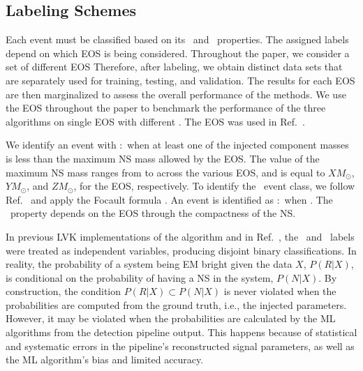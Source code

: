 \subsection*{Labeling Schemes}


Each event must be classified based on its \hasns\ and \hasrem\ properties. The assigned labels depend on which \ac{EOS} is being considered. Throughout the paper, we consider a set of
 different EOS   Therefore, after labeling, we obtain  distinct data sets that are separately used
for training, testing, and validation. The results for each \ac{EOS} are then marginalized to assess the overall performance of the methods. We use the  \ac{EOS}
throughout the paper to benchmark the performance of the three algorithms on single \ac{EOS} with different . The  \ac{EOS} was used in
Ref.\ .


We identify an event with \hasns:\true\ when at least one of the injected component masses is less than the maximum \ac{NS} mass allowed by the \ac{EOS}. The value of the maximum
\ac{NS} mass ranges from  to  across the various \ac{EOS}, and is equal to $XM_\odot$, $YM_\odot$, and $ZM_\odot$, for the  \ac{EOS}, respectively. To
identify the \hasrem\ event class, we follow Ref.\  and apply the Focault formula . An event is identified as \hasrem:\true\ when .
The \hasrem\ property depends on the \ac{EOS} through the compactness of the \ac{NS}.

In previous \ac{LVK} implementations of the algorithm and in Ref.\ , the \hasns\ and \hasrem\ labels were treated as independent variables, producing disjoint
binary classifications. In reality, the probability of a system being \ac{EM} bright given the data $X$, $P(R|X)$, is conditional on the probability of having a \ac{NS} in the system,
$P(N|X)$. By construction, the condition $P(R|X)\subset P(N|X)$ is never violated when the probabilities are computed from the ground truth, i.e., the injected parameters. However, it
may be violated when the probabilities are calculated by the \ac{ML} algorithms from the detection pipeline output. This happens because of statistical and systematic errors in the
pipeline's reconstructed signal parameters, as well as the \ac{ML} algorithm's bias and limited accuracy. 

